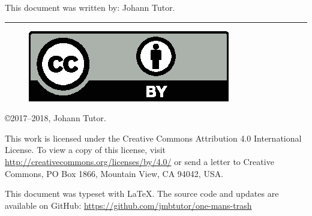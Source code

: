 \documentclass{article}
\begin{document}
This document was written by:
Johann Tutor.

\medskip
\hrule

{
  \small
  \begin{figure}
    \includegraphics[scale=0.5]{cc-by.eps}
  \end{figure}

  \copyright 2017--2018, Johann Tutor.

  This work is licensed under the Creative Commons Attribution 4.0
  International License. To view a copy of this license, visit
  \url{http://creativecommons.org/licenses/by/4.0/} or send a letter to Creative Commons, PO Box 1866, Mountain View, CA 94042, USA.

  This document was typeset with \LaTeX. The source code and updates are available on GitHub: \url{https://github.com/jmbtutor/one-mans-trash}
}
\end{document}
